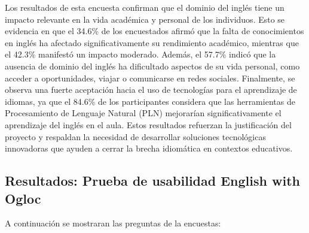 Los resultados de esta encuesta confirman que el dominio del inglés tiene un impacto relevante en la vida académica y personal de los individuos. Esto se evidencia en que el 34.6\% de los encuestados afirmó que la falta de conocimientos en inglés ha afectado significativamente su rendimiento académico, mientras que el 42.3\% manifestó un impacto moderado. Además, el 57.7\% indicó que la ausencia de dominio del inglés ha dificultado aspectos de su vida personal, como acceder a oportunidades, viajar o comunicarse en redes sociales. Finalmente, se observa una fuerte aceptación hacia el uso de tecnologías para el aprendizaje de idiomas, ya que el 84.6\% de los participantes considera que las herramientas de Procesamiento de Lenguaje Natural (PLN) mejorarían significativamente el aprendizaje del inglés en el aula. Estos resultados  refuerzan la justificación del proyecto y respaldan la necesidad de desarrollar soluciones tecnológicas innovadoras que ayuden a cerrar la brecha idiomática en contextos educativos.


\subsection{Resultados:  Prueba de usabilidad English with Ogloc}

A continuación se mostraran las preguntas de la encuestas:

